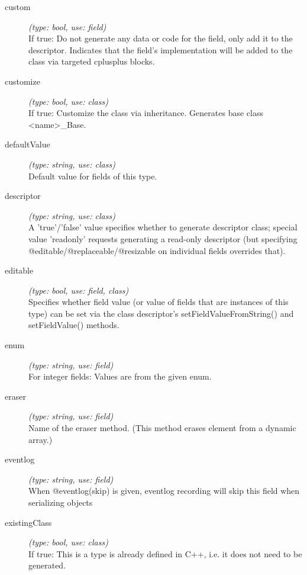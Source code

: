 \begin{description}
\item[custom] \textit{(type: bool, use: field)} \\
    If true: Do not generate any data or code for the field, only add it to the
    descriptor. Indicates that the field's implementation will be added to the
    class via targeted cplusplus blocks.

\item[customize] \textit{(type: bool, use: class)} \\
    If true: Customize the class via inheritance. Generates base class
    <name>\_Base.

\item[defaultValue] \textit{(type: string, use: class)} \\
    Default value for fields of this type.

\item[descriptor] \textit{(type: string, use: class)} \\
    A 'true'/'false' value specifies whether to generate descriptor class;
    special value 'readonly' requests generating a read-only descriptor (but
    specifying @editable/@replaceable/@resizable on individual fields overrides
    that).

\item[editable] \textit{(type: bool, use: field, class)} \\
    Specifies whether field value (or value of fields that are instances of this
    type) can be set via the class descriptor's setFieldValueFromString() and
    setFieldValue() methods.

\item[enum] \textit{(type: string, use: field)} \\
    For integer fields: Values are from the given enum.

\item[eraser] \textit{(type: string, use: field)} \\
    Name of the eraser method. (This method erases element from a dynamic
    array.)

\item[eventlog] \textit{(type: string, use: field)} \\
    When @eventlog(skip) is given, eventlog recording will skip this field when
    serializing objects

\item[existingClass] \textit{(type: bool, use: class)} \\
    If true: This is a type is already defined in C++, i.e. it does not need to
    be generated.


\end{description}
